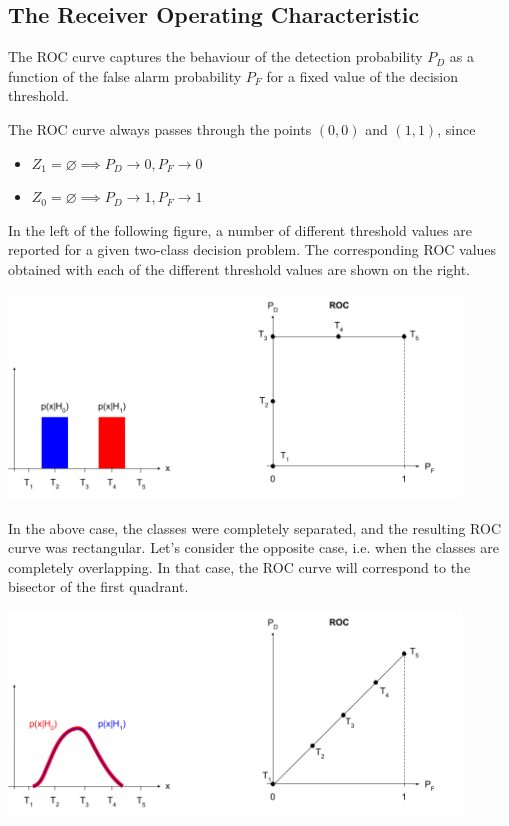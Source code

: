 \documentclass[oneside,onecolumn]{report}
\begin{document}
\subsection{The Receiver Operating Characteristic}
The ROC curve captures the behaviour of the detection probability $P_D$ as a function of the false alarm probability $P_F$ for a fixed value of the decision threshold.

The ROC curve always passes through the points $(0, 0)$ and $(1, 1)$, since
\begin{itemize}
    \item $Z_1 = \varnothing \implies P_D \to 0, P_F \to 0$
    \item $Z_0 = \varnothing \implies P_D \to 1, P_F \to 1$
\end{itemize}


In the left of the following figure, a number of different threshold values are reported for a given two-class decision problem.
The corresponding ROC values obtained with each of the different threshold values are shown on the right.
\begin{center}
    \includegraphics[width=12cm]{roc_curve_example.png}
\end{center}

In the above case, the classes were completely separated, and the resulting ROC curve was rectangular.
Let's consider the opposite case, i.e. when the classes are completely overlapping.
In that case, the ROC curve will correspond to the bisector of the first quadrant.
\begin{center}
    \includegraphics[width=12cm]{roc_curve_overlapping.png}
\end{center}
\end{document}
